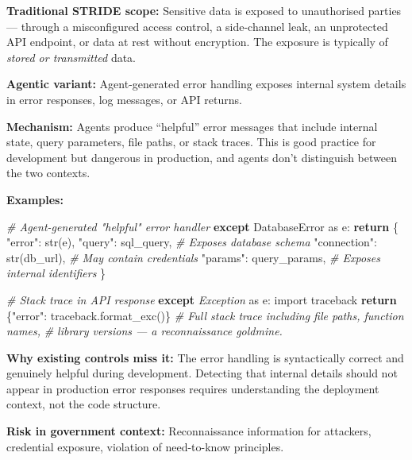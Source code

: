 \documentclass[a4paper,11pt]{report}
\newenvironment{Shaded}{\begin{snugshade}}{\end{snugshade}}
\newcommand{\BuiltInTok}[1]{#1}
\newcommand{\CommentTok}[1]{\textcolor[rgb]{0.56,0.35,0.01}{\textit{#1}}}
\newcommand{\ControlFlowTok}[1]{\textcolor[rgb]{0.13,0.29,0.53}{\textbf{#1}}}
\newcommand{\ImportTok}[1]{#1}
\newcommand{\NormalTok}[1]{#1}
\newcommand{\PreprocessorTok}[1]{\textcolor[rgb]{0.56,0.35,0.01}{\textit{#1}}}
\newcommand{\StringTok}[1]{\textcolor[rgb]{0.31,0.60,0.02}{#1}}
\begin{document}
\textbf{Traditional STRIDE scope:} Sensitive data is exposed to
unauthorised parties --- through a misconfigured access control, a
side-channel leak, an unprotected API endpoint, or data at rest without
encryption. The exposure is typically of \emph{stored or transmitted}
data.

\textbf{Agentic variant:} Agent-generated error handling exposes
internal system details in error responses, log messages, or API
returns.

\textbf{Mechanism:} Agents produce ``helpful'' error messages that
include internal state, query parameters, file paths, or stack traces.
This is good practice for development but dangerous in production, and
agents don't distinguish between the two contexts.

\textbf{Examples:}

\begin{Shaded}
\begin{Highlighting}[]
\CommentTok{\# Agent{-}generated "helpful" error handler}
\ControlFlowTok{except}\NormalTok{ DatabaseError }\ImportTok{as}\NormalTok{ e:}
    \ControlFlowTok{return}\NormalTok{ \{}
        \StringTok{"error"}\NormalTok{: }\BuiltInTok{str}\NormalTok{(e),}
        \StringTok{"query"}\NormalTok{: sql\_query,         }\CommentTok{\# Exposes database schema}
        \StringTok{"connection"}\NormalTok{: }\BuiltInTok{str}\NormalTok{(db\_url),  }\CommentTok{\# May contain credentials}
        \StringTok{"params"}\NormalTok{: query\_params,     }\CommentTok{\# Exposes internal identifiers}
\NormalTok{    \}}

\CommentTok{\# Stack trace in API response}
\ControlFlowTok{except} \PreprocessorTok{Exception} \ImportTok{as}\NormalTok{ e:}
    \ImportTok{import}\NormalTok{ traceback}
    \ControlFlowTok{return}\NormalTok{ \{}\StringTok{"error"}\NormalTok{: traceback.format\_exc()\}}
    \CommentTok{\# Full stack trace including file paths, function names,}
    \CommentTok{\# library versions — a reconnaissance goldmine.}
\end{Highlighting}
\end{Shaded}

\textbf{Why existing controls miss it:} The error handling is
syntactically correct and genuinely helpful during development.
Detecting that internal details should not appear in production error
responses requires understanding the deployment context, not the code
structure.

\textbf{Risk in government context:} Reconnaissance information for
attackers, credential exposure, violation of need-to-know principles.
\end{document}
